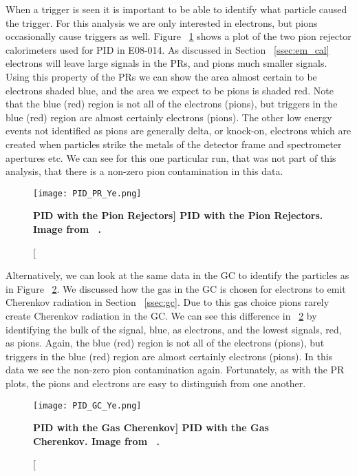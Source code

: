 When a trigger is seen it is important to be able to identify what particle caused the trigger. For this analysis we are only interested in electrons, but pions occasionally cause triggers as well. Figure ~\ref{fig:pid_pr_ye} shows a plot of the two pion rejector calorimeters used for PID in E08-014. As discussed in Section ~\ref{ssec:em_cal} electrons will leave large signals in the PRs, and pions much smaller signals. Using this property of the PRs we can show the area almost certain to be electrons shaded blue, and the area we expect to be pions is shaded red. Note that the blue (red) region is not all of the electrons (pions), but triggers in the blue (red) region are almost certainly electrons (pions). The other low energy events not identified as pions are generally delta, or knock-on, electrons which are created when particles strike the metals of the detector frame and spectrometer apertures etc. We can see for this one particular run, that was not part of this analysis, that there is a non-zero pion contamination in this data. 

\begin{figure}[!ht]
\begin{center}
\texttt{[image: PID\_PR\_Ye.png]}
\end{center}
\caption[\bf{PID with the Pion Rejectors}]{
{\bf{PID with the Pion Rejectors.}} Image from ~\cite{Thesis:Ye}.}
\label{fig:pid_pr_ye}
\end{figure}

Alternatively, we can look at the same data in the GC to identify the particles as in Figure ~\ref{fig:pid_gc_ye}. We discussed how the gas in the GC is chosen for electrons to emit Cherenkov radiation in Section ~\ref{ssec:gc}. Due to this gas choice pions rarely create Cherenkov radiation in the GC. We can see this difference in ~\ref{fig:pid_gc_ye} by identifying the bulk of the signal, blue, as electrons, and the lowest signals, red, as pions. Again, the blue (red) region is not all of the electrons (pions), but triggers in the blue (red) region are almost certainly electrons (pions). In this data we see the non-zero pion contamination again. Fortunately, as with the PR plots, the pions and electrons are easy to distinguish from one another.

\begin{figure}[!ht]
\begin{center}
\texttt{[image: PID\_GC\_Ye.png]}
\end{center}
\caption[\bf{PID with the Gas Cherenkov}]{
{\bf{PID with the Gas Cherenkov.}} Image from ~\cite{Thesis:Ye}.}
\label{fig:pid_gc_ye}
\end{figure}

